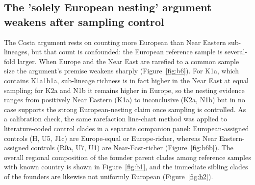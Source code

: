 \documentclass[11pt]{article}
\begin{document}
\subsection{The 'solely European nesting' argument weakens after sampling control}
The Costa argument rests on counting more European than Near Eastern sub-lineages, but that count is confounded: the European reference sample is several-fold larger. When Europe and the Near East are rarefied to a common sample size the argument's premise weakens sharply (Figure~\ref{fig:b6}). For K1a, which contains K1a1b1a, sub-lineage richness is in fact higher in the Near East at equal sampling; for K2a and N1b it remains higher in Europe, so the nesting evidence ranges from positively Near Eastern (K1a) to inconclusive (K2a, N1b) but in no case supports the strong European-nesting claim once sampling is controlled. As a calibration check, the same rarefaction line-chart method was applied to literature-coded control clades in a separate companion panel: European-assigned controls (H, U5, J1c) are Europe-equal or Europe-richer, whereas Near Eastern-assigned controls (R0a, U7, U1) are Near-East-richer (Figure~\ref{fig:b6b}). The overall regional composition of the founder parent clades among reference samples with known country is shown in Figure~\ref{fig:b1}, and the immediate sibling clades of the founders are likewise not uniformly European (Figure~\ref{fig:b2}).
\end{document}
